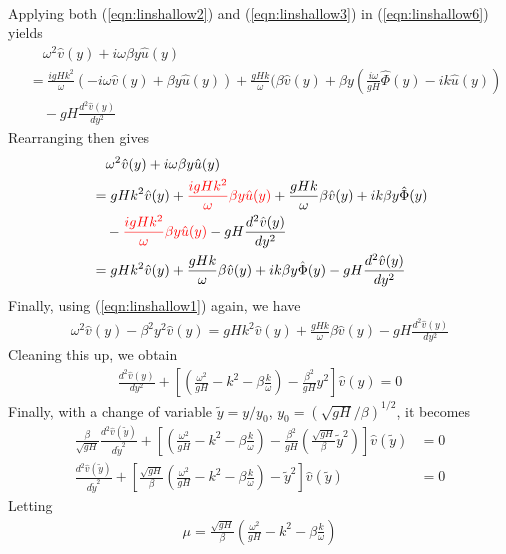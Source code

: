 \begin{solution}
\begin{align}
\end{align}
Applying both (\ref{eqn:linshallow2}) and (\ref{eqn:linshallow3}) in (\ref{eqn:linshallow6}) yields
\begin{align*}
&\quad \omega^2 \hat{v}(y) + i \omega\beta y \hat{u}(y) \\
&= \frac{i gHk^2}{\omega}(-i\omega \hat{v}(y) + \beta y \hat{u}(y)) + \frac{gHk}{\omega}(\beta\hat{v}(y) + \beta y (\frac{i \omega}{gH} \hat{\Phi}(y) - i k\hat{u}(y)) \\
&\quad - gH \frac{d^2\hat{v}(y)}{dy^2}    
\end{align*}
Rearranging then gives
\begin{align*}
&\quad \omega^2 \hat{v}(y) + i \omega\beta y \hat{u}(y) \\
&= gHk^2 \hat{v}(y) + \textcolor{red}{\frac{i gHk^2}{\omega} \beta y \hat{u}(y)} + \frac{gHk}{\omega}\beta\hat{v}(y) + i k \beta y \hat{\Phi}(y) \\
&\quad - \textcolor{red}{\frac{i gHk^2}{\omega} \beta y \hat{u}(y)} - gH \frac{d^2\hat{v}(y)}{dy^2} \\
&= gHk^2 \hat{v}(y)  + \frac{gHk}{\omega}\beta\hat{v}(y) + i k \beta y \hat{\Phi}(y) - gH \frac{d^2\hat{v}(y)}{dy^2}
\end{align*}
Finally, using (\ref{eqn:linshallow1}) again, we have
\begin{align*}
\omega^2 \hat{v}(y) - \beta^2 y^2 \hat{v}(y) = gHk^2 \hat{v}(y)  + \frac{gHk}{\omega}\beta\hat{v}(y) - gH \frac{d^2\hat{v}(y)}{dy^2}    
\end{align*}
Cleaning this up, we obtain
\begin{align*}
\frac{d^2\hat{v}(y)}{dy^2} + [(\frac{\omega^2}{gH} - k^2 - \beta\frac{k}{\omega}) - \frac{\beta^2}{gH}y^2]\hat{v}(y) = 0
\end{align*}
Finally, with a change of variable $\tilde{y} = y/y_0$, $y_0 = (\sqrt{gH}/\beta)^{1/2}$, it becomes
\begin{align*}
\frac{\beta}{\sqrt{gH}} \frac{d^2\hat{v}(\tilde{y})}{d\tilde{y}^2} + [(\frac{\omega^2}{gH} - k^2 - \beta\frac{k}{\omega}) - \frac{\beta^2}{gH}(\frac{\sqrt{gH}}{\beta}\tilde{y}^2)]\hat{v}(\tilde{y}) &= 0 \\
\frac{d^2\hat{v}(\tilde{y})}{d\tilde{y}^2} + [\frac{\sqrt{gH}}{\beta}(\frac{\omega^2}{gH} - k^2 - \beta\frac{k}{\omega}) - \tilde{y}^2]\hat{v}(\tilde{y}) &= 0   
\end{align*}
Letting 
\begin{align*}
\mu = \frac{\sqrt{gH}}{\beta}(\frac{\omega^2}{gH} - k^2 - \beta\frac{k}{\omega})

\end{align*}
\end{solution}
